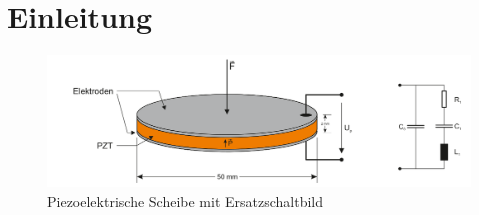 \chapter{Einleitung} \label{Einleitung}



\begin{figure}[h]
    \centering
    \includegraphics[width=1 \textwidth]{image/Piezo_Skizze.png}
    \caption{Piezoelektrische Scheibe mit Ersatzschaltbild  \cite{laborpraktikum2022} }
\end{figure}




